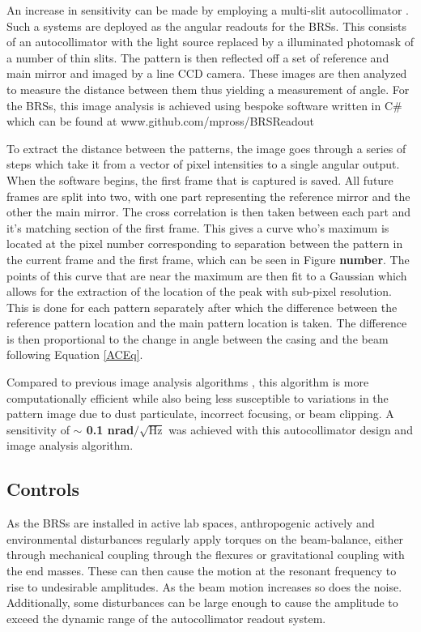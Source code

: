 \documentclass [12pt, proquest]{uwthesis}[2019]
\begin{document}
An increase in sensitivity can be made by employing a multi-slit autocollimator \cite{MSA}. Such a systems are deployed as the angular readouts for the BRSs. This consists of an autocollimator with the light source replaced by a illuminated photomask of a number of thin slits. The pattern is then reflected off a set of reference and main mirror and imaged by a line CCD camera. These images are then analyzed to measure the distance between them thus yielding a measurement of angle. For the BRSs, this image analysis is achieved using bespoke software written in C\# which can be found at www.github.com/mpross/BRSReadout

To extract the distance between the patterns, the image goes through a series of steps which take it from a vector of pixel intensities to a single angular output. When the software begins, the first frame that is captured is saved. All future frames are split into two, with one part representing the reference mirror and the other the main mirror. The cross correlation is then taken between each part and it's matching section of the first frame. This gives a curve who's maximum is located at the pixel number corresponding to separation between the pattern in the current frame and the first frame, which can be seen in Figure \textbf{number}. The points of this curve that are near the maximum are then fit to a Gaussian which allows for the extraction of the location of the peak with sub-pixel resolution. This is done for each pattern separately after which the difference between the reference pattern location and the main pattern location is taken. The difference is then proportional to the change in angle between the casing and the beam following Equation \ref{ACEq}.

Compared to previous image analysis algorithms \cite{MSAPaper}, this algorithm is more computationally efficient while also being less susceptible to variations in the pattern image due to dust particulate, incorrect focusing, or beam clipping. A sensitivity of \textbf{$\sim$ 0.1 nrad$/\sqrt{\text{Hz}}$} was achieved with this autocollimator design and image analysis algorithm.

\subsection{Controls}

\quad As the BRSs are installed in active lab spaces, anthropogenic actively and environmental disturbances regularly apply torques on the beam-balance, either through mechanical coupling through the flexures or gravitational coupling with the end masses. These can then cause the motion at the resonant frequency to rise to undesirable amplitudes. As the beam motion increases so does the noise. Additionally, some disturbances can be large enough to cause the amplitude to exceed the dynamic range of the autocollimator readout system.
\end{document}
